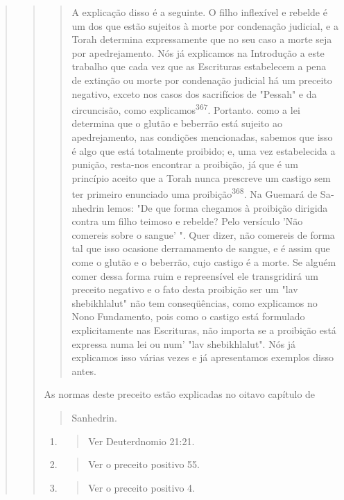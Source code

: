 \begin{quote}
\begin{quote}
\begin{quote}
A explicação disso é a seguinte. O filho inflexível e rebelde é um dos
que estão sujeitos à morte por condenação judicial, e a Torah determina
ex­pressamente que no seu caso a morte seja por
apedrejamento. Nós já expli­camos na Introdução a este
trabalho que cada vez que as Escrituras estabele­cem a pena de extinção
ou morte por condenação judicial há um preceito ne­gativo, exceto nos
casos dos sacrifícios de "Pessah" e da circuncisão, como
explicamos\textsuperscript{367}. Portanto. como a lei determina que o
glutão e beberrão está su­jeito ao apedrejamento, nas condições
mencionadas, sabemos que isso é algo que está totalmente proibido; e,
uma vez estabelecida a punição, resta-nos en­contrar a proibição, já que
é um princípio aceito que a Torah nunca prescreve um castigo sem ter
primeiro enunciado uma proibição\textsuperscript{368}. Na Guemará de
Sa­nhedrin lemos: "De que forma chegamos à proibição dirigida contra um
filho teimoso e rebelde? Pelo versículo 'Não comereis sobre o sangue' ".
Quer di­zer, não comereis de forma tal que isso ocasione derramamento de
sangue, e é assim que come o glutão e o beberrão, cujo castigo é a
morte. Se alguém co­mer dessa forma ruim e repreensível ele transgridirá
um preceito negativo e o fato desta proibição ser um "lav shebikhlalut"
não tem conseqüências, como explicamos no Nono Fundamento, pois como o
castigo está formulado explici­tamente nas Escrituras, não importa se a
proibição está expressa numa lei ou num' "lav shebikhlalut". Nós já
explicamos isso várias vezes e já apresentamos exemplos disso antes.
\end{quote}

As normas deste preceito estão explicadas no oitavo capítulo de

\begin{quote}
Sanhedrin.
\end{quote}

\begin{enumerate}
\def\labelenumi{\arabic{enumi}.}
\setcounter{enumi}{365}
\item
 \begin{quote}
 Ver Deuterdnomio 21:21.
 \end{quote}
\item
 \begin{quote}
 Ver o preceito positivo 55.
 \end{quote}
\item
 \begin{quote}
 Ver o preceito positivo 4.
 \end{quote}
\end{enumerate}


\end{quote}
\end{quote}
